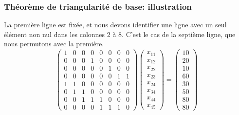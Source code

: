 \documentclass[usepdftitle=false, aspectratio=169]{beamer}
\begin{document}
\begin{frame}
\frametitle{Théorème de triangularité de base: illustration}

La première ligne est fixée, et nous devons identifier une ligne avec un seul élément non nul dans les colonnes 2 à 8.
C'est le cas de la septième ligne, que nous permutons avec la première.
\[
\begin{pmatrix}
 1 & 0 & 0 & 0 & 0 & 0 & 0 & 0 \\
 0 & 0 & 0 & 1 & 0 & 0 & 0 & 0 \\
 0 & 0 & 0 & 0 & 0 & 1 & 0 & 0 \\
 0 & 0 & 0 & 0 & 0 & 0 & 1 & 1 \\
 1 & 1 & 0 & 0 & 0 & 0 & 0 & 0 \\
 0 & 1 & 1 & 0 & 0 & 0 & 0 & 0 \\
 0 & 0 & 1 & 1 & 1 & 0 & 0 & 0 \\
 0 & 0 & 0 & 0 & 1 & 1 & 1 & 0
\end{pmatrix}
\begin{pmatrix}
x_{11} \\
x_{12} \\
x_{22} \\
x_{23} \\
x_{24} \\
x_{34} \\
x_{44} \\
x_{45}
\end{pmatrix}
=
\begin{pmatrix}
10 \\
20 \\
10 \\
60 \\
30 \\
50 \\
80 \\
80
\end{pmatrix}
\]

\end{frame}
\end{document}
